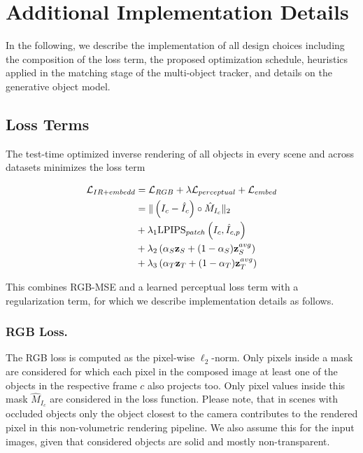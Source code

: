 \section{Additional Implementation Details}

In the following, we describe the implementation of all design choices including the composition of the loss term, the proposed optimization schedule, heuristics applied in the matching stage of the multi-object tracker, and details on the generative object model.

\subsection{Loss Terms}
%
The test-time optimized inverse rendering of all objects in every scene and across datasets minimizes the loss term

\begin{equation}
\begin{aligned}
    \mathcal{L}_{IR+embedd} &= \mathcal{L}_{RGB} + \lambda \mathcal{L}_{perceptual} + \mathcal{L}_{embed} \\
    &= \| \left( I_c - \hat{I}_c \right) \circ \hat{M}_{I_c} \|_2 \\
    & + \lambda_1 \space \text{LPIPS}_{patch}\left( I_c, \hat{I}_{c,p}  \right) \\
    & +  \lambda_2 \left(\alpha_S\mathbf{z}_S + (1 - \alpha_S)\mathbf{z}_S^{avg} \right) \\
    & + \lambda_3 \left( \alpha_T\mathbf{z}_T + (1 - \alpha_T)\mathbf{z}_T^{avg} \right)
\end{aligned}
\end{equation}

This combines RGB-MSE and a learned perceptual loss term with a regularization term, for which we describe implementation details as follows. 

\subsubsection{RGB Loss.}
The RGB loss is computed as the pixel-wise $\ell_2$-norm. Only pixels inside a mask are considered for which each pixel in the composed image at least one of the objects in the respective frame $c$ also projects too. Only pixel values inside this mask $\hat M_{I_c}$ are considered in the loss function. Please note, that in scenes with occluded objects only the object closest to the camera contributes to the rendered pixel in this non-volumetric rendering pipeline. We also assume this for the input images, given that considered objects are solid and mostly non-transparent.    


